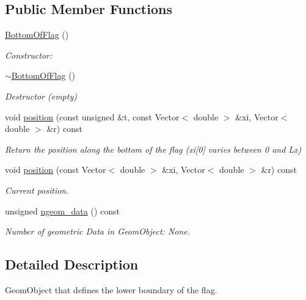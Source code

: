 \subsection*{Public Member Functions}
\begin{DoxyCompactItemize}
\item 
\hyperlink{classFlag__definition_1_1BottomOfFlag_a5433f7ea42d0ac1c8eef2c1d65f070de}{Bottom\+Of\+Flag} ()
\begin{DoxyCompactList}\small\item\em Constructor\+: \end{DoxyCompactList}\item 
\hyperlink{classFlag__definition_1_1BottomOfFlag_ab3689967f7beab309822c4a4d9b59f32}{$\sim$\+Bottom\+Of\+Flag} ()
\begin{DoxyCompactList}\small\item\em Destructor (empty) \end{DoxyCompactList}\item 
void \hyperlink{classFlag__definition_1_1BottomOfFlag_a3d3054be363af2acfeca9769bd7c6684}{position} (const unsigned \&t, const Vector$<$ double $>$ \&xi, Vector$<$ double $>$ \&r) const
\begin{DoxyCompactList}\small\item\em Return the position along the bottom of the flag (xi\mbox{[}0\mbox{]} varies between 0 and Lx) \end{DoxyCompactList}\item 
void \hyperlink{classFlag__definition_1_1BottomOfFlag_aa534848e399e6fa14a279ec45142df87}{position} (const Vector$<$ double $>$ \&xi, Vector$<$ double $>$ \&r) const
\begin{DoxyCompactList}\small\item\em Current position. \end{DoxyCompactList}\item 
unsigned \hyperlink{classFlag__definition_1_1BottomOfFlag_a7aba815793bcc775d97b6be533ff6b44}{ngeom\+\_\+data} () const
\begin{DoxyCompactList}\small\item\em Number of geometric Data in Geom\+Object\+: None. \end{DoxyCompactList}\end{DoxyCompactItemize}


\subsection{Detailed Description}
Geom\+Object that defines the lower boundary of the flag. 

